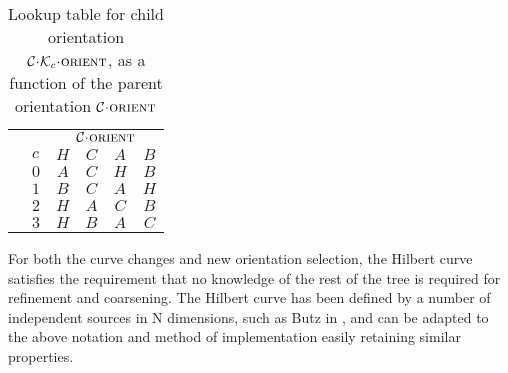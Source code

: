 \documentclass[twoside]{IIBproject}
\newcommand{\acc}{{\mkern 0.5mu\cdot\mkern 0.5mu}}
\numberwithin{figure}{section}
\begin{document}
            \begin{table}[H]
                \centering
                \captionsetup{width=0.8\textwidth}
                \caption{Lookup table for child orientation $\mathcal{C}\acc\mathcal{K}_c\acc\textproc{orient}$, as a function of the parent orientation $\mathcal{C}\acc\textproc{orient}$}
                \label{tab:hilb-Dc}
                \begin{tabularx}{5cm}{l>{\raggedright}X*{4}{c}}
                    \toprule
                    &   & \multicolumn{4}{c}{$\mathcal{C}\acc\textproc{orient}$} \\ \cmidrule{3-6}
                    & $c$   & $H$    & $C$    & $A$    & $B$    \\ \midrule
                    & $0$   & $A$    & $C$    & $H$    & $B$    \\
                    & $1$   & $B$    & $C$    & $A$    & $H$    \\
                    & $2$   & $H$    & $A$    & $C$    & $B$    \\
                    & $3$   & $H$    & $B$    & $A$    & $C$    \\ \bottomrule
                \end{tabularx}
            \end{table}

            For both the curve changes and new orientation selection, the Hilbert curve satisfies the requirement that no knowledge of the rest of the tree is required for refinement and coarsening. The Hilbert curve has been defined by a number of independent sources in N dimensions, such as Butz in \cite{butz71}, and can be adapted to the above notation and method of implementation easily retaining similar properties. 
\end{document}
